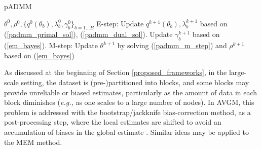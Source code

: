 \documentclass{article}
\newcommand{\eg}[0]{\emph{e.g., }}
\newcommand{\1}[0]{\ensuremath{\boldsymbol{1}}\xspace}
\begin{document}
\begin{algorithm}[tb]
   \caption{pADMM}
   \label{alg:pADMM}
\begin{algorithmic}
    $\theta^0, \rho^0, \{q^0(\theta_b), \lambda_b^0, \gamma_b^0\}_{b=1\ldots B}$
   \STATE E-step: 
   \STATE Update $q^{k+1}(\theta_b), \lambda_b^{k+1}$ based on (\ref{padmm_primal_sol}), (\ref{padmm_dual_sol}).
   \STATE Update $\gamma_b^{k+1}$ based on (\ref{em_bayes}).
   \ENDFOR
   \STATE M-step:
   \STATE Update $\theta^{k+1}$ by solving (\ref{padmm_m_step}) and $\rho^{k+1}$ based on (\ref{em_bayes})
   \ENDFOR
\end{algorithmic}
\end{algorithm}
As discussed at the beginning of Section \ref{proposed_frameworks}, in the large-scale setting, the dataset is (pre-)partitioned into blocks, and some blocks may provide unreliable or biased estimates, particularly as the amount of data in each block diminishes (\eg as one scales to a large number of nodes). In AVGM, this problem is addressed with the bootstrap/jackknife bias-correction method, as a post-processing step, where the local estimates are shifted to avoid an accumulation of biases in the global estimate \cite{YZhang2012, Scott2013}. Similar ideas may be applied to the MEM method.
\end{document}
